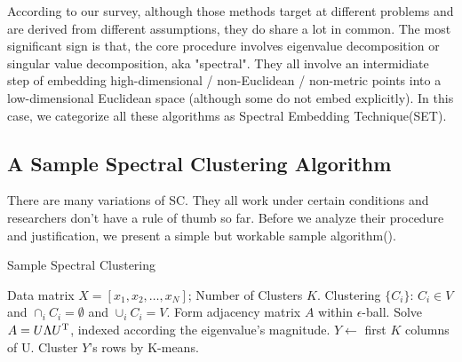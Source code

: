 According to our survey, although those methods target at different problems
and are derived from different assumptions, they do share a lot in common. 
The most significant sign is that, the core procedure involves 
eigenvalue decomposition or singular value decomposition, aka "spectral". 
They all involve an intermidiate step of embedding high-dimensional / 
non-Euclidean / non-metric points into a low-dimensional Euclidean space
(although some do not embed explicitly). In this case, we categorize all 
these algorithms as Spectral Embedding Technique(SET). 

\subsection{A Sample Spectral Clustering Algorithm}


There are many variations of SC. They all work under certain conditions
and researchers don't have a rule of thumb so far. Before we analyze their
procedure and justification, we present a simple but workable sample 
algorithm(\ralg{\ref{alg:sc_sample}}). 

\begin{algorithm}[htb]
	\caption{Sample Spectral Clustering}
	\label{alg:sc_sample}
	\begin{algorithmic}[1]
		\REQUIRE Data matrix $X = [x_1, x_2, \ldots, x_N]$;  
		Number of Clusters $K$. 
		\ENSURE Clustering $\{C_i\}$: $C_i \in V$ 
			and $\cap_i C_i = \emptyset$
			and $\cup_i C_i = V$. 
		\STATE Form adjacency matrix $A$ within $\epsilon$-ball.
		\STATE Solve $A = U \Lambda U^\mathrm{T}$, indexed according 
		the eigenvalue's magnitude. 
		\STATE $Y \leftarrow$ first $K$ columns of U. 
		\STATE Cluster $Y$'s rows by K-means. 
	\end{algorithmic}
\end{algorithm}

